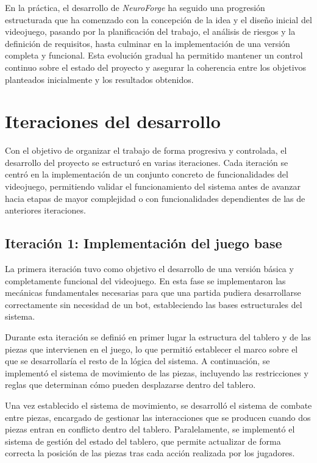 En la práctica, el desarrollo de \textit{NeuroForge} ha seguido una progresión estructurada que ha comenzado con la concepción de la idea y el diseño inicial del videojuego, pasando por la planificación del trabajo, el análisis de riesgos y la definición de requisitos, hasta culminar en la implementación de una versión completa y funcional. Esta evolución gradual ha permitido mantener un control continuo sobre el estado del proyecto y asegurar la coherencia entre los objetivos planteados inicialmente y los resultados obtenidos.

\section{Iteraciones del desarrollo}

Con el objetivo de organizar el trabajo de forma progresiva y controlada, el desarrollo del proyecto se estructuró en varias iteraciones. Cada iteración se centró en la implementación de un conjunto concreto de funcionalidades del videojuego, permitiendo validar el funcionamiento del sistema antes de avanzar hacia etapas de mayor complejidad o con funcionalidades dependientes de las de anteriores iteraciones.

\subsection{Iteración 1: Implementación del juego base}

La primera iteración tuvo como objetivo el desarrollo de una versión básica y completamente funcional del videojuego. En esta fase se implementaron las mecánicas fundamentales necesarias para que una partida pudiera desarrollarse correctamente sin necesidad de un bot, estableciendo las bases estructurales del sistema.

Durante esta iteración se definió en primer lugar la estructura del tablero y de las piezas que intervienen en el juego, lo que permitió establecer el marco sobre el que se desarrollaría el resto de la lógica del sistema. A continuación, se implementó el sistema de movimiento de las piezas, incluyendo las restricciones y reglas que determinan cómo pueden desplazarse dentro del tablero.

Una vez establecido el sistema de movimiento, se desarrolló el sistema de combate entre piezas, encargado de gestionar las interacciones que se producen cuando dos piezas entran en conflicto dentro del tablero. Paralelamente, se implementó el sistema de gestión del estado del tablero, que permite actualizar de forma correcta la posición de las piezas tras cada acción realizada por los jugadores.

